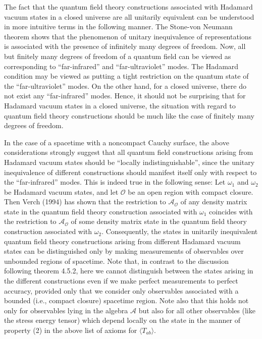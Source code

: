 \documentclass[11pt,a4paper]{article}
\begin{document}
The fact that the quantum field theory constructions associated with Hadamard vacuum states in a closed universe are all unitarily equivalent can be understood in more intuitive terms in the following manner. The Stone-von Neumann theorem shows that the phenomenon of unitary inequivalence of representations is associated with the presence of infinitely many degrees of freedom. Now, all but finitely many degrees of freedom of a quantum field can be viewed as corresponding to ``far-infrared'' and ``far-ultraviolet'' modes. The Hadamard condition may be viewed as putting a tight restriction on the quantum state of the ``far-ultraviolet'' modes. On the other hand, for a closed universe, there do not exist any ``far-infrared'' modes. Hence, it should not be surprising that for Hadamard vacuum states in a closed universe, the situation with regard to quantum field theory constructions should be much like the case of finitely many degrees of freedom.

In the case of a spacetime with a noncompact Cauchy surface, the above considerations strongly suggest that all quantum field constructions arising from Hadamard vacuum states should be ``locally indistinguishable'', since the unitary inequivalence of different constructions should manifest itself only with respect to the ``far-infrared'' modes. This is indeed true in the following sense: Let \(\omega_1\) and \(\omega_2\) be Hadamard vacuum states, and let \(\mathcal O\) be an open region with compact closure. Then Verch (1994) has shown that the restriction to \(\mathcal A_{\mathcal O}\) of any density matrix state in the quantum field theory construction associated with \(\omega_1\) coincides with the restriction to \(\mathcal{A}_{\mathcal{O}}\) of some density matrix state in the quantum field theory construction associated with \(\omega_2\). Consequently, the states in unitarily inequivalent quantum field theory constructions arising from different Hadamard vacuum states can be distinguished only by making measurements of observables over unbounded regions of spacetime. Note that, in contrast to the discussion following theorem 4.5.2, here we cannot distinguish between the states arising in the different constructions even if we make perfect measurements to perfect accuracy, provided only that we consider only observables associated with a bounded (i.e., compact closure) spacetime region. Note also that this holds not only for observables lying in the algebra \(\mathcal A\) but also for all other observables (like the stress energy tensor) which depend locally on the state in the manner of property (2) in the above \hypertarget{source-111}{} list of axioms for \(\langle T_{ab} \rangle\).
\end{document}

